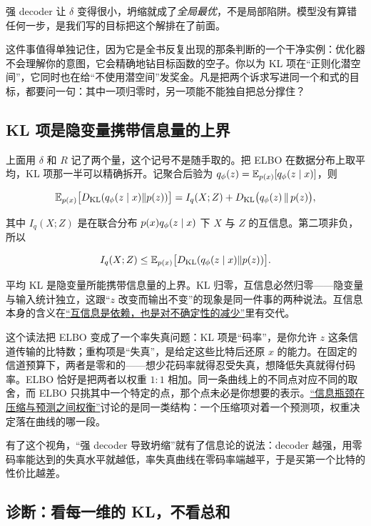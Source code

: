 强 decoder 让 \(\delta\) 变得很小，坍缩就成了\emph{全局最优}，不是局部陷阱。模型没有算错任何一步，是我们写的目标把这个解排在了前面。

这件事值得单独记住，因为它是全书反复出现的那条判断的一个干净实例：优化器不会理解你的意图，它会精确地钻目标函数的空子。你以为 KL 项在``正则化潜空间''，它同时也在给``不使用潜空间''发奖金。凡是把两个诉求写进同一个和式的目标，都要问一句：其中一项归零时，另一项能不能独自把总分撑住？

\subsection{KL 项是隐变量携带信息量的上界}

上面用 \(\delta\) 和 \(R\) 记了两个量，这个记号不是随手取的。把 ELBO 在数据分布上取平均，KL 项那一半可以精确拆开。记聚合后验为 \(q_\phi(z)=\mathbb{E}_{p(x)}[q_\phi(z\mid x)]\)，则

\[
\mathbb{E}_{p(x)}\big[D_{\mathrm{KL}}(q_\phi(z\mid x)\Vert p(z))\big]
= I_q(X;Z) + D_{\mathrm{KL}}\big(q_\phi(z)\,\Vert\, p(z)\big),
\]

其中 \(I_q(X;Z)\) 是在联合分布 \(p(x)q_\phi(z\mid x)\) 下 \(X\) 与 \(Z\) 的互信息。第二项非负，所以

\[
I_q(X;Z) \le \mathbb{E}_{p(x)}\big[D_{\mathrm{KL}}(q_\phi(z\mid x)\Vert p(z))\big].
\]

平均 KL 是隐变量所能携带信息量的上界。KL 归零，互信息必然归零——隐变量与输入统计独立，这跟``\(z\) 改变而输出不变''的现象是同一件事的两种说法。互信息本身的含义在\hyperref[sec:07-Information-Theory/02-Joint-Information/02]{``互信息是依赖，也是对不确定性的减少''}里有交代。

这个读法把 ELBO 变成了一个率失真问题：KL 项是``码率''，是你允许 \(z\) 这条信道传输的比特数；重构项是``失真''，是给定这些比特后还原 \(x\) 的能力。在固定的信道预算下，两者是零和的——想少花码率就得忍受失真，想降低失真就得付码率。ELBO 恰好是把两者以权重 \(1{:}1\) 相加。同一条曲线上的不同点对应不同的取舍，而 ELBO 只挑其中一个特定的点，那个点未必是你想要的表示。\hyperref[sec:13-Machine-Learning/11-Information-Theoretic-Learning/04]{``信息瓶颈在压缩与预测之间权衡''}讨论的是同一类结构：一个压缩项对着一个预测项，权重决定落在曲线的哪一段。

有了这个视角，``强 decoder 导致坍缩''就有了信息论的说法：decoder 越强，用零码率能达到的失真水平就越低，率失真曲线在零码率端越平，于是买第一个比特的性价比越差。

\subsection{诊断：看每一维的 KL，不看总和}

